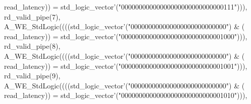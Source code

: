 \begin{DoxyCode}
{      read_latency}\textcolor{vhdlchar}{)}\textcolor{vhdlchar}{)} \textcolor{vhdlchar}{=} \textcolor{comment}{std\_logic\_vector}\textcolor{vhdlchar}{'}\textcolor{vhdlchar}{(}\textcolor{vhdllogic}{"00000000000000000000000000000111"}\textcolor{vhdlchar}{)}\textcolor{vhdlchar}{)}\textcolor{vhdlchar}{)}\textcolor{vhdlchar}{,} \textcolor{vhdlchar}{
      rd_valid_pipe}\textcolor{vhdlchar}{(}\textcolor{vhdllogic}{}\textcolor{vhdllogic}{7}\textcolor{vhdlchar}{)}\textcolor{vhdlchar}{,} \textcolor{vhdlchar}{A\_WE\_StdLogic}\textcolor{vhdlchar}{(}\textcolor{vhdlchar}{(}\textcolor{vhdlchar}{(}\textcolor{vhdlchar}{(}\textcolor{comment}{std\_logic\_vector}\textcolor{vhdlchar}{'}\textcolor{vhdlchar}{(}\textcolor{vhdllogic}{"000000000000000000000000000"}\textcolor{vhdlchar}{)} \textcolor{vhdlchar}{&} \textcolor{vhdlchar}{(}\textcolor{vhdlchar}{
      read_latency}\textcolor{vhdlchar}{)}\textcolor{vhdlchar}{)} \textcolor{vhdlchar}{=} \textcolor{comment}{std\_logic\_vector}\textcolor{vhdlchar}{'}\textcolor{vhdlchar}{(}\textcolor{vhdllogic}{"00000000000000000000000000001000"}\textcolor{vhdlchar}{)}\textcolor{vhdlchar}{)}\textcolor{vhdlchar}{)}\textcolor{vhdlchar}{,} \textcolor{vhdlchar}{
      rd_valid_pipe}\textcolor{vhdlchar}{(}\textcolor{vhdllogic}{}\textcolor{vhdllogic}{8}\textcolor{vhdlchar}{)}\textcolor{vhdlchar}{,} \textcolor{vhdlchar}{A\_WE\_StdLogic}\textcolor{vhdlchar}{(}\textcolor{vhdlchar}{(}\textcolor{vhdlchar}{(}\textcolor{vhdlchar}{(}\textcolor{comment}{std\_logic\_vector}\textcolor{vhdlchar}{'}\textcolor{vhdlchar}{(}\textcolor{vhdllogic}{"000000000000000000000000000"}\textcolor{vhdlchar}{)} \textcolor{vhdlchar}{&} \textcolor{vhdlchar}{(}\textcolor{vhdlchar}{
      read_latency}\textcolor{vhdlchar}{)}\textcolor{vhdlchar}{)} \textcolor{vhdlchar}{=} \textcolor{comment}{std\_logic\_vector}\textcolor{vhdlchar}{'}\textcolor{vhdlchar}{(}\textcolor{vhdllogic}{"00000000000000000000000000001001"}\textcolor{vhdlchar}{)}\textcolor{vhdlchar}{)}\textcolor{vhdlchar}{)}\textcolor{vhdlchar}{,} \textcolor{vhdlchar}{
      rd_valid_pipe}\textcolor{vhdlchar}{(}\textcolor{vhdllogic}{}\textcolor{vhdllogic}{9}\textcolor{vhdlchar}{)}\textcolor{vhdlchar}{,} \textcolor{vhdlchar}{A\_WE\_StdLogic}\textcolor{vhdlchar}{(}\textcolor{vhdlchar}{(}\textcolor{vhdlchar}{(}\textcolor{vhdlchar}{(}\textcolor{comment}{std\_logic\_vector}\textcolor{vhdlchar}{'}\textcolor{vhdlchar}{(}\textcolor{vhdllogic}{"000000000000000000000000000"}\textcolor{vhdlchar}{)} \textcolor{vhdlchar}{&} \textcolor{vhdlchar}{(}\textcolor{vhdlchar}{
      read_latency}\textcolor{vhdlchar}{)}\textcolor{vhdlchar}{)} \textcolor{vhdlchar}{=} \textcolor{comment}{std\_logic\_vector}\textcolor{vhdlchar}{'}\textcolor{vhdlchar}{(}\textcolor{vhdllogic}{"00000000000000000000000000001010"}\textcolor{vhdlchar}{)}\textcolor{vhdlchar}{)}\textcolor{vhdlchar}{)}\textcolor{vhdlchar}{,} \textcolor{vhdlchar}{
}
\end{DoxyCode}
